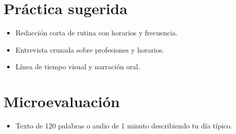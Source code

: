\section{Práctica sugerida}
\begin{itemize}[leftmargin=*]
	\item Redacción corta de rutina con horarios y frecuencia.
	\item Entrevista cruzada sobre profesiones y horarios.
	\item Línea de tiempo visual y narración oral.
\end{itemize}

\section{Microevaluación}
\begin{itemize}[leftmargin=*]
	\item Texto de 120 palabras o audio de 1 minuto describiendo tu día típico.
\end{itemize}
